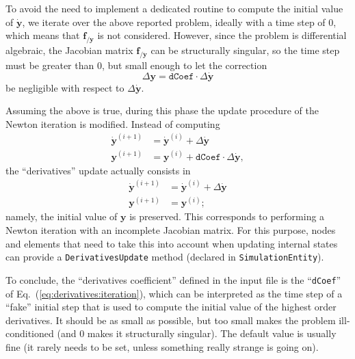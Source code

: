 \documentclass[10pt,fleqn,subeqn]{report}
\newcommand{\T}[1]{\bm{#1}}
\begin{document}
To avoid the need to implement a dedicated routine to compute 
the initial value of $\dot{\T{y}}$, we iterate over the above reported problem, 
ideally with a time step of $0$, which means that $\T{f}_{/\T{y}}$ is not considered.  
However, since the problem is differential algebraic, 
the Jacobian matrix $\T{f}_{/\dot{\T{y}}}$ can be structurally singular,
so the time step must be greater than $0$, but small enough to let the correction
\begin{equation}
	\Delta \T{y} = \texttt{dCoef} \cdot \Delta \dot{\T{y}}
	\label{eq:derivatives:dcoef}
\end{equation}
be negligible with respect to $\Delta \dot{\T{y}}$.  

Assuming the above is true, during this phase the update procedure
of the Newton iteration is modified.
Instead of computing
\begin{subequations}
\label{eq:derivatives:update}
\begin{align}
	\dot{\T{y}}^{(i+1)} &= \dot{\T{y}}^{(i)} + \Delta\dot{\T{y}}
	\\
	\T{y}^{(i+1)} &= \T{y}^{(i)} + \texttt{dCoef} \cdot \Delta\dot{\T{y}}
	,
\end{align}
\end{subequations}
the ``derivatives'' update actually consists in
\begin{subequations}
\label{eq:derivatives:modified-update}
\begin{align}
	\dot{\T{y}}^{(i+1)} &= \dot{\T{y}}^{(i)} + \Delta\dot{\T{y}}
	\\
	\T{y}^{(i+1)} &= \T{y}^{(i)}
	;
\end{align}
\end{subequations}
namely, the initial value of $\T{y}$ is preserved.
This corresponds to performing a Newton iteration
with an incomplete Jacobian matrix.
For this purpose, nodes and elements that need to take this into account
when updating internal states can provide a \texttt{DerivativesUpdate} method
(declared in \texttt{SimulationEntity}).

To conclude, the ``derivatives coefficient'' defined in the input file 
is the ``\texttt{dCoef}'' of Eq.~(\ref{eq:derivatives:iteration}), 
which can be interpreted as the time step of a ``fake'' 
initial step that is used to compute the initial value of 
the highest order derivatives.  
It should be as small as possible, but too small makes 
the problem ill-conditioned (and $0$ makes it structurally singular).  
The default value is usually fine 
(it rarely needs to be set, unless something 
really strange is going on).\\
\end{document}

